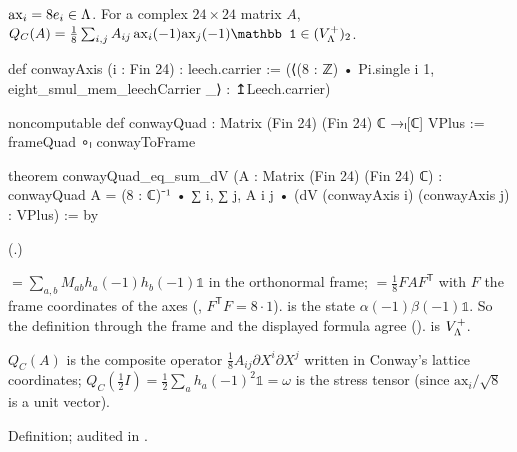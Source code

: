 \begin{definition}\label{ch21:def:conwayQuad}
$\mathrm{ax}_i=8e_i\in{\Lambda}$.  For a complex $24\times24$ matrix $A$,
$Q_C(A)=\tfrac18\sum_{i,j}A_{ij}\,\mathrm{ax}_i(-1)\mathrm{ax}_j(-1)\mathbb1\in(V_\Leech^+)_2$.
\end{definition}
\begin{leancode}
def conwayAxis (i : Fin 24) : leech.carrier :=
  (⟨(8 : ℤ) • Pi.single i 1, eight_smul_mem_leechCarrier _⟩ : ↥Leech.carrier)
\end{leancode}
\begin{leancode}
noncomputable def conwayQuad : Matrix (Fin 24) (Fin 24) ℂ →ₗ[ℂ] VPlus := frameQuad ∘ₗ conwayToFrame
\end{leancode}
\begin{leancode}
theorem conwayQuad_eq_sum_dV (A : Matrix (Fin 24) (Fin 24) ℂ) :
    conwayQuad A = (8 : ℂ)⁻¹ • ∑ i, ∑ j, A i j • (dV (conwayAxis i) (conwayAxis j) : VPlus) := by
\end{leancode}
(.)
\begin{dictionary}
 $=\sum_{a,b}M_{ab}h_a(-1)h_b(-1)\mathbb1$ in the orthonormal frame;
 $=\tfrac18FAF^{\mathsf T}$ with $F$ the frame coordinates of the axes
(, $F^{\mathsf T}F=8\cdot1$).   is the state $\alpha(-1)\beta(-1)\mathbb1$.
So the definition through the frame and the displayed formula agree ().
 is $V_{\Lambda}^+$.
\end{dictionary}
\begin{physics}
$Q_C(A)$ is the composite operator $\tfrac18A_{ij}\partial X^i\partial X^j$ written in Conway's
lattice coordinates; $Q_C(\tfrac12I)=\tfrac12\sum_a h_a(-1)^2\mathbb1=\omega$ is the stress tensor
(since $\mathrm{ax}_i/\sqrt8$ is a unit vector).
\end{physics}
\begin{status}
Definition; audited in .
\end{status}

